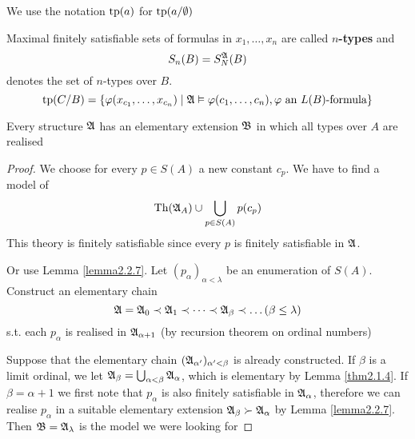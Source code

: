 \documentclass[11pt]{article}
\begin{document}
We use the notation \(\operatorname{tp}(a)\) for \(\operatorname{tp}(a/\emptyset)\)

Maximal finitely satisfiable sets of formulas in \(x_1,\dots,x_n\) are called
\textbf{\(n\)-types} and
\begin{equation*}
S_n(B)=S_N^{\mathfrak{A}}(B)
\end{equation*}
denotes the set of \(n\)-types over \(B\).
\begin{equation*}
\operatorname{tp}(C/B)=\{\varphi(x_{c_1},\dots,x_{c_n})\mid\mathfrak{A}\vDash\varphi(c_1,\dots,c_n),\varphi
\text{ an $L(B)$-formula}\}
\end{equation*}

\begin{corollary}[]
Every structure \(\mathfrak{A}\) has an elementary extension \(\mathfrak{B}\) in which all
types over \(A\) are realised
\end{corollary}

\begin{proof}
We choose for every \(p\in S(A)\) a new constant \(c_p\). We have to find a
model of
\begin{equation*}
\operatorname{Th}(\mathfrak{A}_A)\cup\bigcup_{p\in S(A)}p(c_p)
\end{equation*}
This theory is finitely satisfiable since every \(p\) is finitely satisfiable
in \(\mathfrak{A}\).

Or use Lemma \ref{lemma2.2.7}. Let \((p_\alpha)_{\alpha<\lambda}\) be an enumeration of
\(S(A)\). Construct an elementary chain
\begin{equation*}
\mathfrak{A}=\mathfrak{A}_0\prec\mathfrak{A}_1\prec\dots\prec\mathfrak{A}_\beta\prec\dots(\beta\le\lambda)
\end{equation*}
s.t. each \(p_\alpha\) is realised in \(\mathfrak{A}_{\alpha+1}\) (by recursion
theorem on ordinal numbers)

Suppose that the elementary chain \((\mathfrak{A}_{\alpha'})_{\alpha'<\beta}\) is already
constructed. If \(\beta\) is a limit ordinal, we let
\(\mathfrak{A}_\beta=\bigcup_{\alpha<\beta}\mathfrak{A}_\alpha\), which is elementary by Lemma \ref{thm2.1.4}. If
\(\beta=\alpha+1\) we  first note that \(p_\alpha\) is also finitely
satisfiable in \(\mathfrak{A}_\alpha\), therefore we can realise \(p_\alpha\) in a
suitable elementary extension \(\mathfrak{A}_\beta\succ\mathfrak{A}_\alpha\) by Lemma
\ref{lemma2.2.7}. Then \(\mathfrak{B}=\mathfrak{A}_\lambda\) is the model we were looking for
\end{proof}
\end{document}
